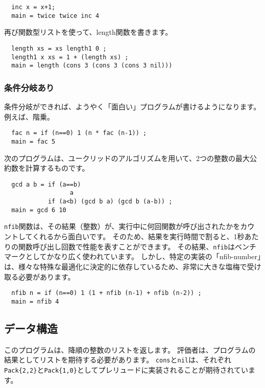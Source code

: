 \documentclass{jarticle}
\begin{document}
\begin{verbatim}
  inc x = x+1;
  main = twice twice inc 4
\end{verbatim}

再び関数型リストを使って、length関数を書きます。

\begin{verbatim}
  length xs = xs length1 0 ;
  length1 x xs = 1 + (length xs) ;
  main = length (cons 3 (cons 3 (cons 3 nil)))
\end{verbatim}

\subsubsection{条件分岐あり}

条件分岐ができれば、ようやく「面白い」プログラムが書けるようになります。
例えば、階乗。

\begin{verbatim}
  fac n = if (n==0) 1 (n * fac (n-1)) ;
  main = fac 5
\end{verbatim}

次のプログラムは、ユークリッドのアルゴリズムを用いて、2つの整数の最大公約数を計算するものです。

\begin{verbatim}
  gcd a b = if (a==b)
                  a
            if (a<b) (gcd b a) (gcd b (a-b)) ;
  main = gcd 6 10
\end{verbatim}

\texttt{nfib}関数は、その結果（整数）が、実行中に何回関数が呼び出されたかをカウントしてくれるから面白いです。
そのため、結果を実行時間で割ると、1秒あたりの関数呼び出し回数で性能を表すことができます。
その結果、\texttt{nfib}はベンチマークとしてかなり広く使われています。
しかし、特定の実装の「nfib-number」は、様々な特殊な最適化に決定的に依存しているため、非常に大きな塩梅で受け取る必要があります。

\begin{verbatim}
  nfib n = if (n==0) 1 (1 + nfib (n-1) + nfib (n-2)) ;
  main = nfib 4
\end{verbatim}

\subsection{データ構造}

このプログラムは、降順の整数のリストを返します。
評価者は、プログラムの結果としてリストを期待する必要があります。
\texttt{cons}と\texttt{nil}は、それぞれ\texttt{Pack\{2,2\}}と\texttt{Pack\{1,0\}}としてプレリュードに実装されることが期待されています。
\end{document}
